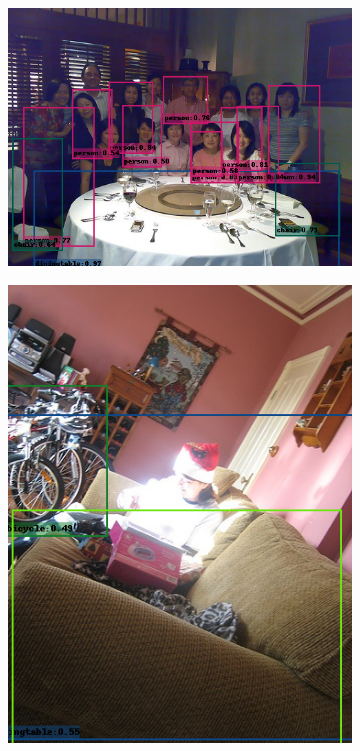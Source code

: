 \begin{figure}[h!]
\begin{subfigure}[b]{0.54\textwidth}
        \includegraphics[width=\textwidth]{Images/voc_output/003123.png}
    \end{subfigure}
    \hspace{4cm}
    \begin{subfigure}[b]{0.28\textwidth}
        \centering
        \includegraphics[width=\textwidth]{Images/voc_output/004101.png}

\end{subfigure}
\end{figure}
